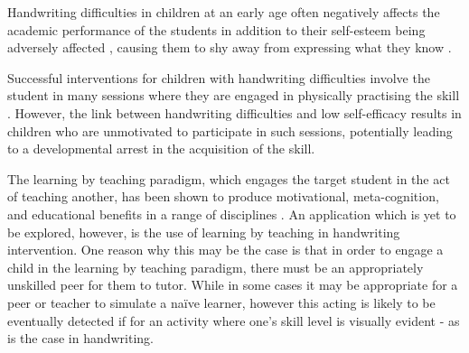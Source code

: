 \documentclass{sig-alternate}
\begin{document}
Handwriting difficulties in children at an early age often negatively affects
the academic performance of the students \cite{Christensen2005} in addition to
their self-esteem being adversely affected \cite{Malloy1995}, causing them to
shy away from expressing what they know \cite{Medwell2008}.

Successful interventions for children with handwriting difficulties involve the
student in many sessions where they are engaged in physically practising the
skill \cite{Hoy2011}. However, the link between handwriting difficulties and low
self-efficacy \cite{Engel-Yeger2009} results in children who are unmotivated to
participate in such sessions, potentially leading to a developmental arrest in
the acquisition of the skill. 


The learning by teaching paradigm, which engages the target student in the act
of teaching another, has been shown to produce motivational, meta-cognition, and
educational benefits in a range of disciplines \cite{Rohrbeck2003}. An
application which is yet to be explored, however, is the use of learning by
teaching in handwriting intervention. One reason why this may be the case is
that in order to engage a child in the learning by teaching paradigm, there must
be an appropriately unskilled peer for them to tutor. While in some cases it may
be appropriate for a peer or teacher to simulate a na\"ive learner, however this
acting is likely to be eventually detected if for an activity where one's skill
level is visually evident - as is the case in handwriting.
\end{document}
